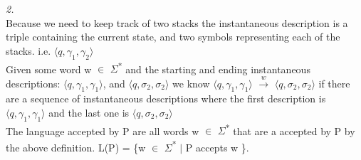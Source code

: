 \documentclass[12pt]{report}
\begin{document}
\textit{2.}\\
Because we need to keep track of two stacks the instantaneous description is a triple containing the current state, and two symbols representing each of the stacks. i.e. $\langle q, \gamma_1, \gamma_2 \rangle$\\

Given some word w $\in$ $\Sigma$\textsuperscript{*} and the starting and ending instantaneous descriptions:  $\langle q, \gamma_1, \gamma_1 \rangle$, and $\langle q, \sigma_2, \sigma_2 \rangle$ we know $\langle q, \gamma_1, \gamma_1 \rangle$ $\xrightarrow{w}$ $\langle q, \sigma_2, \sigma_2 \rangle$ if there are a sequence of instantaneous descriptions where the first description is $\langle q, \gamma_1, \gamma_1 \rangle$ and the last one is $\langle q, \sigma_2, \sigma_2 \rangle$\\

The language accepted by P are all words w $\in$ $\Sigma$\textsuperscript{*} that are a accepted by P by the above definition.  L(P) = \{w $\in$ $\Sigma$\textsuperscript{*} $\vert$ P accepts w \}.\\
\end{document}
